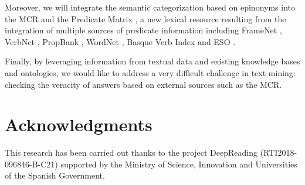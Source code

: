 \documentclass[runningheads]{llncs}
\begin{document}
Moreover, we will integrate the semantic categorization based on epinonyms into the MCR and the Predicate Matrix \cite{de2016predicate}, a new lexical resource resulting from the integration of multiple sources of predicate information including FrameNet \cite{baker1998berkeley}, VerbNet \cite{schuler2005verbnet}, PropBank \cite{palmer2005proposition}, WordNet \cite{fellbaum98}, Basque Verb Index \cite{estarrona2020corpus} and ESO \cite{segers2015eso}.

Finally, by leveraging information from textual data and existing knowledge bases and ontologies, we would like to address a very difficult challenge in text mining: checking the veracity of answers based on external sources such as the MCR.

\section*{Acknowledgments}
This research has been carried out thanks to the project DeepReading (RTI2018-096846-B-C21) supported by the Ministry of Science, Innovation and Universities of the Spanish Government. %






%
%


%
\end{document}
